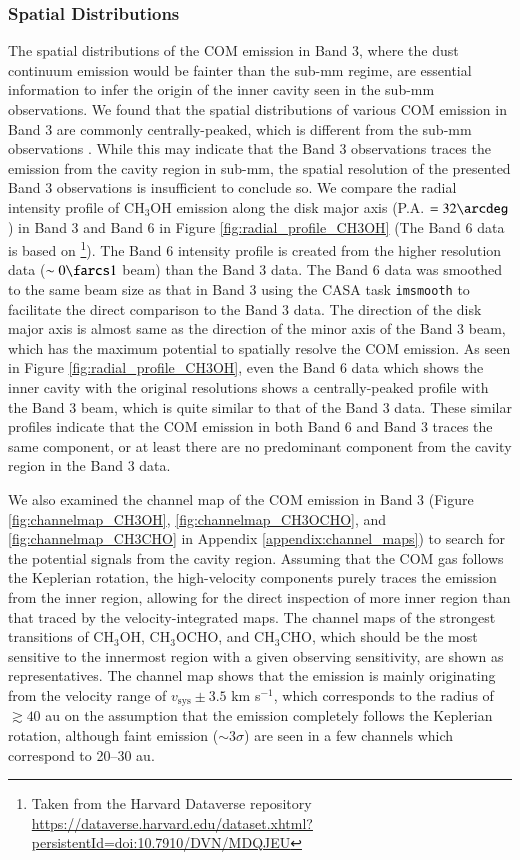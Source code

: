 \documentclass[linenumbers, twocolumn, twocolappendix, astrosymb, times]{aastex631}
\newcommand{\methanol}{CH$_3$OH\xspace}
\newcommand{\acetaldehyde}{CH$_3$CHO\xspace}
\newcommand{\methylformate}{CH$_3$OCHO\xspace}
\begin{document}
\subsubsection{Spatial Distributions}\label{subsubsec:spatial_dist}
The spatial distributions of the COM emission in Band 3, where the dust continuum emission would be fainter than the sub-mm regime, are essential information to infer the origin of the inner cavity seen in the sub-mm observations. We found that the spatial distributions of various COM emission in Band 3 are commonly centrally-peaked, which is different from the sub-mm observations \citep{vantHoff2018, Lee2019, Tobin2023}. While this may indicate that the Band 3 observations traces the emission from the cavity region in sub-mm, the spatial resolution of the presented Band 3 observations is insufficient to conclude so. We compare the radial intensity profile of \methanol emission along the disk major axis (P.A. $= 32\arcdeg$) in Band 3 and Band 6 in Figure \ref{fig:radial_profile_CH3OH} (The Band 6 data is based on \citealt{Tobin2023}\footnote{Taken from the Harvard Dataverse repository \url{https://dataverse.harvard.edu/dataset.xhtml?persistentId=doi:10.7910/DVN/MDQJEU}}). The Band 6 intensity profile is created from the higher resolution data ($\sim0\farcs1$ beam) than the Band 3 data. The Band 6 data was smoothed to the same beam size as that in Band 3 using the CASA task \texttt{imsmooth} to facilitate the direct comparison to the Band 3 data. The direction of the disk major axis is almost same as the direction of the minor axis of the Band 3 beam, which has the maximum potential to spatially resolve the COM emission. As seen in Figure \ref{fig:radial_profile_CH3OH}, even the Band 6 data which shows the inner cavity with the original resolutions \citep{Tobin2023} shows a centrally-peaked profile with the Band 3 beam, which is quite similar to that of the Band 3 data. These similar profiles indicate that the COM emission in both Band 6 and Band 3 traces the same component, or at least there are no predominant component from the cavity region in the Band 3 data.

We also examined the channel map of the COM emission in Band 3 (Figure \ref{fig:channelmap_CH3OH}, \ref{fig:channelmap_CH3OCHO}, and \ref{fig:channelmap_CH3CHO} in Appendix \ref{appendix:channel_maps}) to search for the potential signals from the cavity region. Assuming that the COM gas follows the Keplerian rotation, the high-velocity components purely traces the emission from the inner region, allowing for the direct inspection of more inner region than that traced by the velocity-integrated maps. The channel maps of the strongest transitions of \methanol, \methylformate, and \acetaldehyde, which should be the most sensitive to the innermost region with a given observing sensitivity, are shown as representatives. The channel map shows that the emission is mainly originating from the velocity range of $v_\mathrm{sys} \pm 3.5$ km s$^{-1}$, which corresponds to the radius of $\gtrsim 40$ au on the assumption that the emission completely follows the Keplerian rotation, although faint emission ($\sim3\sigma$) are seen in a few channels which correspond to 20--30 au. 
\end{document}
